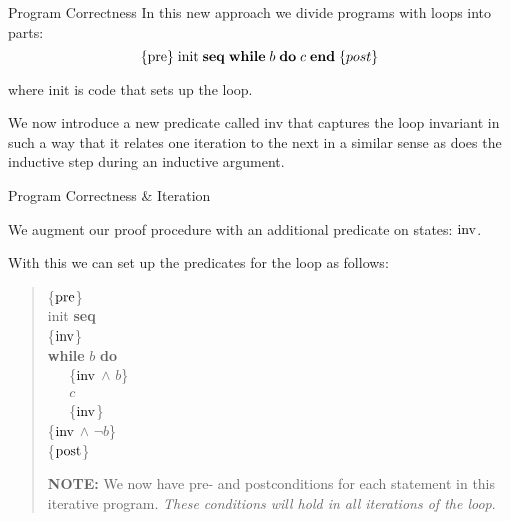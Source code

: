 \documentclass{beamer}
\begin{document}
\begin{frame}[fragile]{Program Correctness}
In this new approach we divide programs with loops into parts:
\[
\{{\rm pre}\} \;{\rm init}\; {\bf seq}\; {\bf while}\; {b}\;{\bf do}\;{c}\; \mbox{\bf end}\;\{post\}
\]

where {\rm init} is code that sets up the loop.

\vspace{.1in}

We now introduce a new predicate called {\rm inv} that captures the loop invariant
in such a way that it relates one iteration to the next in a similar sense as does the inductive step
during an inductive argument.
\end{frame}

\begin{frame}[fragile]{Program Correctness \& Iteration}

We augment our proof procedure with an additional predicate on states: $\rm inv$.

\vspace{.1in}

With this we can set up the predicates for the loop as follows:
\begin{quote}
\begin{minipage}{1.5in}
\{$\rm pre$\}\\
{\rm init} {\bf seq}\\
\{$\rm inv$\}  \\                                  
{\bf while} $b$ {\bf do}  \\                       
{\tt\verb"   "}\{$\rm inv$ $\wedge$ $b$\}  \\
{\tt\verb"   "}$c$    \\
{\tt\verb"   "}\{$\rm inv$\}  \\                            
\{$\rm inv$ $\wedge$ $\neg b$\}\\
\{$\rm post$\}  
\end{minipage}
\begin{minipage}{2in}
{\bf NOTE: } We now have pre- and postconditions for each statement in this iterative
program. {\em These conditions will hold in all iterations of the loop}.
\end{minipage}
\end{quote}                          
\end{frame}
\end{document}
